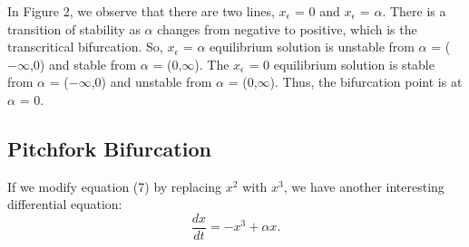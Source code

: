 \documentclass{article}
\theoremstyle{definition}
\theoremstyle{remark}
\newenvironment{problem}[2][Example]{\begin{trivlist}
\item[\hskip \labelsep {\bfseries #1}\hskip \labelsep {\bfseries #2.}]}{\end{trivlist}}
\begin{document}
In Figure 2, we observe that there are two lines, $x_\epsilon$ = $0$ and $x_\epsilon$ = $\alpha$. There is a transition of stability as $\alpha$ changes from negative to positive, which is the transcritical bifurcation. So, $x_\epsilon$ = $\alpha$ equilibrium solution is unstable from $\alpha$ = ($-\infty$,0) and stable from $\alpha$ = (0,$\infty$). The $x_\epsilon$ = $0$ equilibrium solution is stable from $\alpha$ = ($-\infty$,0) and unstable from $\alpha$ = (0,$\infty$). Thus, the bifurcation point is at $\alpha$ = 0. 
\subsection{Pitchfork Bifurcation}
\begin{problem}{2.4.1}
If we modify equation (7) by replacing $x^2$ with $x^3$, we have another interesting differential equation: 
\begin{equation}\label{example 2.4}
    \frac{dx}{dt} = -x^3 + \alpha x .
\end{equation}
\end{problem}
\end{document}
